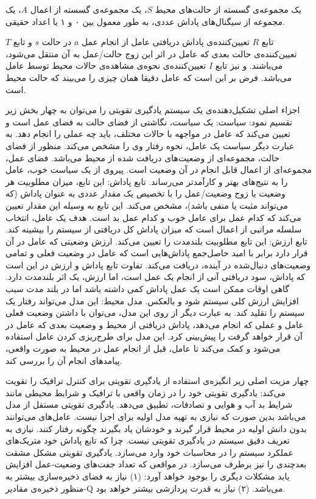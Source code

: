  یک مجموعه‌ی گسسته از حالت‌های محیط $S$،
 یک مجموعه‌ی گسسته از اعمال $A$،
 یک مجموعه از سیگنال‌های پاداش عددی، به طور معمول بین ۰ و ۱ یا اعداد حقیقی.

تابع $R$ تعیین‌کننده‌ی پاداش دریافتی عامل از انجام عمل $a$ در حالت $s$ و تابع $T$ تعیین‌کننده‌ی حالت
بعدی که عامل در اثر این زوج حالت/عمل به آن منتقل می‌شود، می‌باشند. و نیز تابع $I$ تعیین‌کننده‌ی نحوه‌ی مشاهده‌ی حالات محیط توسط عامل می‌باشد. فرض بر این است که عامل
دقیقا همان چیزی را می‌بیند که حالت محیط است.

اجزاء اصلی تشکیل‌دهنده‌ی یک سیستم یادگیری تقویتی را می‌توان به چهار بخش زیر تقسیم نمود:
 سیاست:
یک سیاست، نگاشتی از فضای حالت به فضای عمل است و تعیین می‌کند که عامل در
مواجهه با حالات مختلف، باید چه عملی را انجام دهد. به عبارت دیگر سیاست یک عامل، نحوه 
رفتار وی را مشخص می‌کند. منظور از فضای حالت، مجموعه‌ای از وضعیت‌های دریافت شده از محیط می‌باشد. فضای عمل، مجموعه‌ای از اعمال قابل انجام در آن وضعیت است. پیروی از یک
سیاست خوب، عامل را به نتیج‌های بهتر و کارآمدتر می‌رساند.
 تابع پاداش:
این تابع، میزان مطلوبیت هر وضعیت یا زوج وضعیت/عمل را با تخصیص یک مقدار
عددی به عنوان پاداش (که می‌تواند مثبت یا منفی باشد)، مشخص می‌کند. این تابع به وسیله این  مقدار تعیین می‌کند که کدام عمل برای عامل خوب و کدام عمل بد است. هدف یک عامل، انتخاب
سلسله مراتبی از اعمال است که میزان پاداش کل دریافتی از سیستم را بیشینه کند.
 تابع ارزش:
این تابع مطلوبیت بلندمدت را تعیین می‌کند. ارزش وضعیتی که عامل در آن قرار دارد
برابر با امید حاصل‌جمع پاداش‌هایی است که عامل در وضعیت فعلی و تمامی وضعیت‌های دنبال‌شده
 در آینده، دریافت می‌کند. تفاوت تابع پاداش و ارزش در این است که پاداش، سود دریافتی آنی از انجام یک عمل است، اما ارزش، یک اثر بلندمدت دارد. گاهی اوقات ممکن است یک عمل پاداش
کمی داشته باشد اما در بلند مدت سبب افزایش ارزش کلی سیستم شود و بالعکس.
 مدل محیط:
این مدل می‌تواند رفتار یک سیستم را تقلید کند. به عبارت دیگر از روی این مدل،
می‌توان با داشتن وضعیت فعلی عامل و عملی که انجام می‌دهد، پاداش دریافتی از محیط و وضعیت  بعدی که عامل در آن قرار خواهد گرفت را پیش‌بینی کرد. این مدل برای طرح‌ریزی کردن عامل استفاده می‌شود و کمک می‌کند تا عامل، قبل از انجام عمل در محیط به صورت واقعی، پیامدهای
انجام آن را بررسی کند.

چهار مزیت اصلی زیر انگیزه‌ی استفاده از یادگیری تقویتی برای کنترل  ترافیک را تقویت می‌کند:
 یادگیری تقویتی خود را در زمان واقعی با ترافیک و شرایط محیطی مانند شرایط بد آب و هوایی و تصادفات، تطبیق می‌دهد. 
 یادگیری تقویتی مستقل از مدل می‌باشد بدین صورت که نیازی به تهیه مدل اولیه برای اجرا نیست. عامل‌های می‌توانند بدون دانش اولیه در محیط قرار گیرند و خودشان یاد بگیرند چگونه رفتار کنند.
 نیازی به تعریف دقیق سیستم در یادگیری تقویتی نیست.  چرا که تابع پاداش خود متریک‌های عملکرد سیستم را در محاسبات خود وارد می‌سازد.
 یادگیری تقویتی مشکل مشقت بعدچندی را نیز برطرف می‌سازد.
در مواقعی که تعداد جفت‌های وضعیت-عمل افزایش یابد مشکلات دیگری را بوجود خواهد آورد: (۱) نیاز به فضای ذخیره‌سازی بیشتر به منظور ذخیره‌ی مقادیر-Q می‌باشد. (۲) نیاز به قدرت پردازشی بیشتر خواهد بود.

